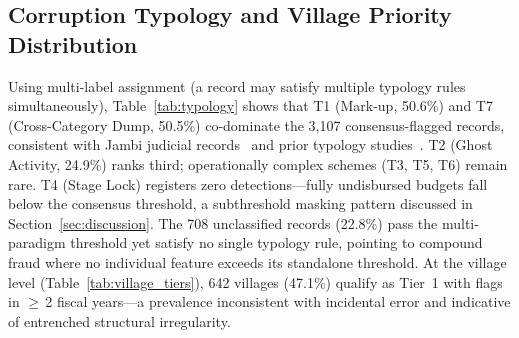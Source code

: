 \documentclass[3p,times,procedia]{elsarticle}
\begin{document}
\subsection{Corruption Typology and Village Priority Distribution}

Using multi-label assignment (a record may satisfy multiple typology rules simultaneously), Table~\ref{tab:typology} shows that T1 (Mark-up, 50.6\%) and T7 (Cross-Category Dump, 50.5\%) co-dominate the 3,107 consensus-flagged records, consistent with Jambi judicial records~\cite{ref15,ref16,ref17,ref18} and prior typology studies~\cite{ref13,ref14}. T2 (Ghost Activity, 24.9\%) ranks third; operationally complex schemes (T3, T5, T6) remain rare. T4 (Stage Lock) registers zero detections---fully undisbursed budgets fall below the consensus threshold, a subthreshold masking pattern discussed in Section~\ref{sec:discussion}. The 708 unclassified records (22.8\%) pass the multi-paradigm threshold yet satisfy no single typology rule, pointing to compound fraud where no individual feature exceeds its standalone threshold. At the village level (Table~\ref{tab:village_tiers}), 642 villages (47.1\%) qualify as Tier~1 with flags in $\geq$\,2 fiscal years---a prevalence inconsistent with incidental error and indicative of entrenched structural irregularity.
\end{document}
